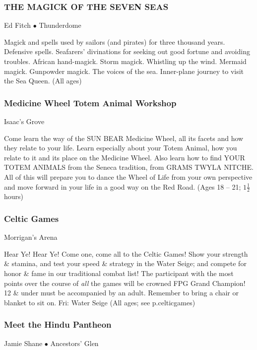 \subsubsection{THE MAGICK OF THE SEVEN SEAS}
\label{Fri-Fitch2}
{\small Ed Fitch $\bullet$  Thunderdome}

 Magick and spells used by sailors (and pirates) for three thousand years. Defensive spells. Seafarers' divinations for seeking out good fortune and avoiding troubles. African hand-magick. Storm magick. Whistling up the wind. Mermaid magick. Gunpowder magick. The voices of the sea. Inner-plane journey to visit the Sea Queen. {\small (All ages)}

\subsubsection{Medicine Wheel Totem Animal Workshop}
\label{Fri-Totem}
{\small  Isaac's Grove}

 Come learn the way of the SUN BEAR Medicine Wheel, all its facets and how they relate to your life.  Learn especially about your Totem Animal, how you relate to it and its place on the Medicine Wheel.  Also learn how to find YOUR TOTEM ANIMALS from the Seneca tradition, from GRAMS TWYLA NITCHE.  All of this will prepare you to dance the Wheel of Life from your own perspective and move forward in your life in a good way on the Red Road. {\small (Ages 18 -- 21; $1\frac{1}{2}$ hours)}

\subsubsection{Celtic Games}
\label{Fri-Celts2}
{\small  Morrigan's Arena}

 Hear Ye! Hear Ye! Come one, come all to the Celtic Games! Show your 
strength \& stamina, and test your speed \& strategy in the Water 
Seige; and compete for honor \& fame in our traditional combat list! 
 The participant with the most points over the course of \textit{all} 
the games will be crowned FPG Grand Champion! 12 \& under must be 
accompanied by an adult.  Remember to bring a chair or blanket to sit 
on.  Fri: Water Seige {\small (All ages; see p.{celticgames})}

\subsubsection{Meet the Hindu Pantheon}
\label{Fri-Shane3}
{\small Jamie Shane $\bullet$  Ancestors' Glen}

